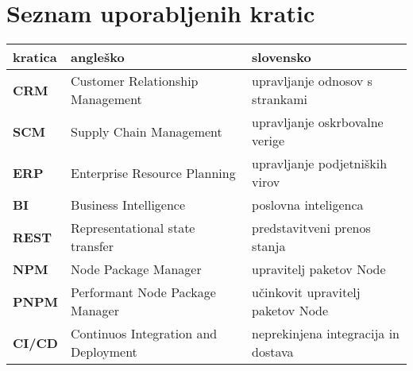 \chapter*{Seznam uporabljenih kratic}

\begin{tabular}{l|l|l}
  {\bf kratica} & {\bf angleško} & {\bf slovensko} \\ \hline
  {\bf CRM} & Customer Relationship Management & upravljanje odnosov s strankami \\
  {\bf SCM} & Supply Chain Management & upravljanje oskrbovalne verige \\
  {\bf ERP} & Enterprise Resource Planning & upravljanje podjetniških virov \\
  {\bf BI} & Business Intelligence & poslovna inteligenca \\
  {\bf REST} & Representational state transfer & predstavitveni prenos stanja \\
  {\bf NPM} & Node Package Manager & upravitelj paketov Node \\
  {\bf PNPM} & Performant Node Package Manager & učinkovit upravitelj paketov Node \\
  {\bf CI/CD} & Continuos Integration and Deployment & neprekinjena integracija in dostava \\
  
\end{tabular}